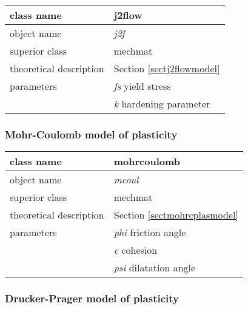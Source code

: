 \begin{center}
\begin{tabular}{|l|l|}
\hline
class name & {\sf j2flow}\index{class!{\sf j2flow}}
\\ \hline
object name & {\it j2f}\index{instance!{\it j2f}}
\\ \hline
superior class & {\sf mechmat}
\\ \hline
theoretical description & Section \ref{sectj2flowmodel}
\\ \hline
parameters & {\it fs} yield stress
\\
 & {\it k} hardening parameter
\\ \hline
\end{tabular}
\end{center}

\subsubsection{Mohr-Coulomb model of plasticity}

\begin{center}
\begin{tabular}{|l|l|}
\hline
class name & {\sf mohrcoulomb}\index{class!{\sf mohrcoulomb}}
\\ \hline
object name & {\it mcoul}\index{instance!{\it mcoul}}
\\ \hline
superior class & {\sf mechmat}
\\ \hline
theoretical description & Section \ref{sectmohrcplasmodel}
\\ \hline
parameters & {\it phi} friction angle
\\
 & {\it c} cohesion
\\
 & {\it psi} dilatation angle
\\ \hline
\end{tabular}
\end{center}


\subsubsection{Drucker-Prager model of plasticity}

